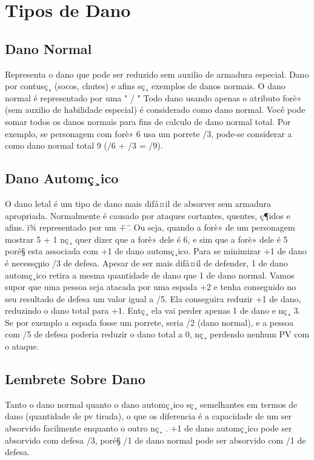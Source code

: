 \section{Tipos de Dano}

\subsection{Dano Normal}

Representa o dano que pode ser reduzido sem auxilio de armadura especial. Dano por contusç¸ (socos, chutes) e afins sç¸ exemplos de danos normais. O dano normal é representado por uma " / " 
	Todo dano usando apenas o atributo forè» (sem auxilio de habilidade especial) é considerado como dano normal. Você pode somar todos os danos normais para fins de calculo de dano normal total. Por exemplo, se personagem com forè» 6 usa um porrete /3, pode-se considerar a como dano normal total 9 (/6 + /3 = /9).


\subsection{Dano Automç¸ico}

O dano letal é um tipo de dano mais difå¤il de absorver sem armadura apropriada. Normalmente é causado por ataques cortantes, quentes, ç¶idos e afins. ï¾ representado por um \" + \". Ou seja, quando a forè» de um personagem mostrar 5 + 1 nç¸ quer dizer que a forè» dele é 6, e sim que a forè» dele é 5 poré§ esta associada com +1 de dano automç¸ico. Para se minimizar +1 de dano é necessçµio /3 de defesa. Apesar de ser mais difå¤il de defender, 1 de dano automç¸ico retira a mesma quantidade de dano que 1 de dano normal. 
Vamos supor que uma pessoa seja atacada por uma espada +2 e tenha conseguido no seu resultado de defesa um valor igual a /5. Ela conseguira reduzir +1 de dano, reduzindo o dano total para +1. Entç¸ ela vai perder apenas 1 de dano e nç¸ 3. Se por exemplo a espada fosse um porrete, seria /2 (dano normal), e a pessoa com /5 de defesa poderia reduzir o dano total a 0, nç¸ perdendo nenhum PV com o ataque.

\subsection{Lembrete Sobre Dano}

Tanto o dano normal quanto o dano automç¸ico sç¸ semelhantes em termos de dano (quantidade de pv tirada), o que os diferencia é a capacidade de um ser absorvido facilmente enquanto o outro nç¸ . +1 de dano automç¸ico pode ser absorvido com defesa /3, poré§ /1 de dano normal pode ser absorvido com /1 de defesa.

